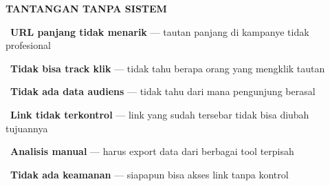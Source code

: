 \documentclass[a4paper]{article}
\begin{document}
\noindent
\begin{minipage}[t]{0.485\textwidth}
    \colorbox{RedLight}{%
        \begin{minipage}{\dimexpr\textwidth-14pt}
            \vspace{5pt}
            {\fontsize{10}{13}\selectfont\bfseries\color{RedText} TANTANGAN TANPA SISTEM}
            \vspace{5pt}
        \end{minipage}}
    \vspace{6pt}

    {\fontsize{9.5}{13}\selectfont\color{TextDark}%
    \textbullet\ \textbf{URL panjang tidak menarik} --- tautan panjang di kampanye tidak profesional\par\vspace{4pt}%
    \textbullet\ \textbf{Tidak bisa track klik} --- tidak tahu berapa orang yang mengklik tautan\par\vspace{4pt}%
    \textbullet\ \textbf{Tidak ada data audiens} --- tidak tahu dari mana pengunjung berasal\par\vspace{4pt}%
    \textbullet\ \textbf{Link tidak terkontrol} --- link yang sudah tersebar tidak bisa diubah tujuannya\par\vspace{4pt}%
    \textbullet\ \textbf{Analisis manual} --- harus export data dari berbagai tool terpisah\par\vspace{4pt}%
    \textbullet\ \textbf{Tidak ada keamanan} --- siapapun bisa akses link tanpa kontrol}%
\end{minipage}%
\hfill%
\end{document}
